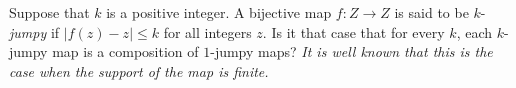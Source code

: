 Suppose that $k$ is a positive integer. A bijective map $f : Z \to Z$ is said to be $k$-\textit{jumpy } if $|f(z) - z| \le k$ for all integers $z$.
Is it that case that for every $k$, each $k$-jumpy map is a composition of $1$-jumpy maps?
\textit{It is well known that this is the case when the support of the map is finite.}